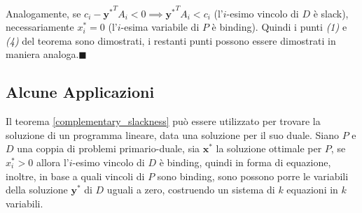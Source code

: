 \documentclass[10pt, letterpaper]{report}
\newcommand{\x}{{\mathbf{x}}}
\newcommand{\y}{{\mathbf{y}}}
\begin{document}
Analogamente, se $c_i-{\y^*}^TA_i<0\implies {\y^*}^TA_i<c_i$ (l'$i$-esimo vincolo di $D$ è slack), necessariamente $x_i^*=0$ (l'$i$-esima variabile di $P$ è binding). Quindi i punti \textit{(1)} e \textit{(4)} del teorema sono dimostrati, i restanti punti possono essere dimostrati in maniera analoga.\hfill$\blacksquare$
\subsection{Alcune Applicazioni}
Il teorema \ref{complementary_slackness} può essere utilizzato per trovare la soluzione di un programma lineare, data una soluzione per il suo duale.
Siano $P$ e $D$ una coppia di problemi primario-duale, sia $\x^*$ la soluzione ottimale per $P$, se $x_i^*>0$ allora l'$i$-esimo vincolo di $D$ è binding, quindi in forma di equazione, inoltre, in base a quali vincoli di $P$ sono binding, sono possono porre le variabili della soluzione $\y^*$ di $D$ uguali a zero, costruendo un sistema di $k$ equazioni in $k$ variabili.\bigskip 
\end{document}
